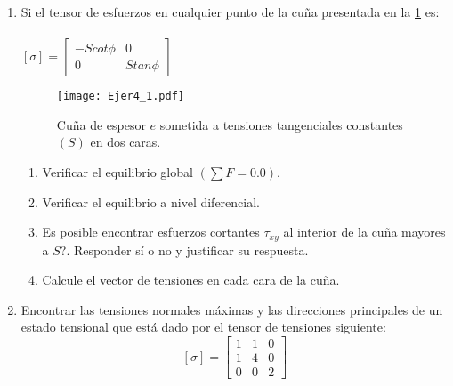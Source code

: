 \documentclass[../notas medios.tex]{subfiles}
\begin{document}
\begin{enumerate}
  
\item \label{punto01} Si el tensor de esfuerzos en cualquier punto de la cu\~na
presentada en la \cref{figure4} es:\\
	\\
	$[\sigma] = \left[ \begin{array}{ccc}
	-S cot \phi & 0 \\ 
	0 & S tan \phi
	\end{array}  \right] $\\
	\begin{figure}[H]
		\centering
		\texttt{[image: Ejer4\_1.pdf]}
		\caption{Cuña de espesor $e$ sometida a tensiones tangenciales constantes $(S)$ en dos caras.}
		\label{figure4}
	\end{figure}
	\begin{enumerate}
		\item Verificar el equilibrio global $\left( \sum F = 0.0 \right)$.
		\item Verificar el equilibrio a nivel diferencial.
		\item  \textquestiondown Es posible encontrar esfuerzos cortantes $\tau_{xy}$ al interior de la cu\~na mayores a $S$?. Responder s\'i o no y justificar su respuesta.
		\item Calcule el vector de tensiones en cada cara de la cu\~na. 
	\end{enumerate}

\item \label{punto02} Encontrar las tensiones normales máximas y las direcciones
principales de un estado tensional que est\'a dado por el tensor de tensiones siguiente:
%
\[ [\sigma] = \left[ \begin{array}{ccc}
	1 & 1 & 0 \\ 
	1 & 4 & 0 \\ 
	0 & 0 & 2
\end{array}  \right]\]


\end{enumerate}
\end{document}
